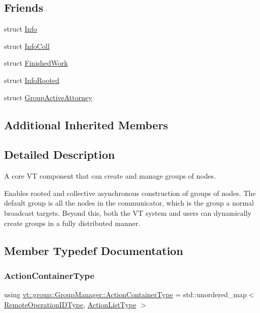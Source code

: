 \subsection*{Friends}
\begin{DoxyCompactItemize}
\item 
struct \hyperlink{structvt_1_1group_1_1_group_manager_af0a264c27d0d08af4b617d2e4675fda7}{Info}
\item 
struct \hyperlink{structvt_1_1group_1_1_group_manager_a977ca475df628d7e164bae4a7a97c001}{Info\+Coll}
\item 
struct \hyperlink{structvt_1_1group_1_1_group_manager_ae1817e369e2c7539a02b4eeb0e5cdb83}{Finished\+Work}
\item 
struct \hyperlink{structvt_1_1group_1_1_group_manager_a612933a09f56f2382ccb3e70a423d418}{Info\+Rooted}
\item 
struct \hyperlink{structvt_1_1group_1_1_group_manager_a3b688c56f16100f140edbbb49b9de739}{Group\+Active\+Attorney}
\end{DoxyCompactItemize}
\subsection*{Additional Inherited Members}


\subsection{Detailed Description}
A core VT component that can create and manage groups of nodes. 

Enables rooted and collective asynchronous construction of groups of nodes. The default group is all the nodes in the communicator, which is the group a normal broadcast targets. Beyond this, both the VT system and users can dynamically create groups in a fully distributed manner. 

\subsection{Member Typedef Documentation}
\mbox{\label{structvt_1_1group_1_1_group_manager_af722b277e2ad6a8dacdfec0184cd8f2f}} 
\subsubsection{\texorpdfstring{Action\+Container\+Type}{ActionContainerType}}
{\footnotesize\ttfamily using \hyperlink{structvt_1_1group_1_1_group_manager_af722b277e2ad6a8dacdfec0184cd8f2f}{vt\+::group\+::\+Group\+Manager\+::\+Action\+Container\+Type} =  std\+::unordered\+\_\+map$<$ \hyperlink{namespacevt_1_1group_a73f2624ddeb535b39a08b6524f26b244}{Remote\+Operation\+I\+D\+Type}, \hyperlink{structvt_1_1group_1_1_group_manager_a48b2dd05bbdda19c5d6195b8932a2716}{Action\+List\+Type} $>$}

